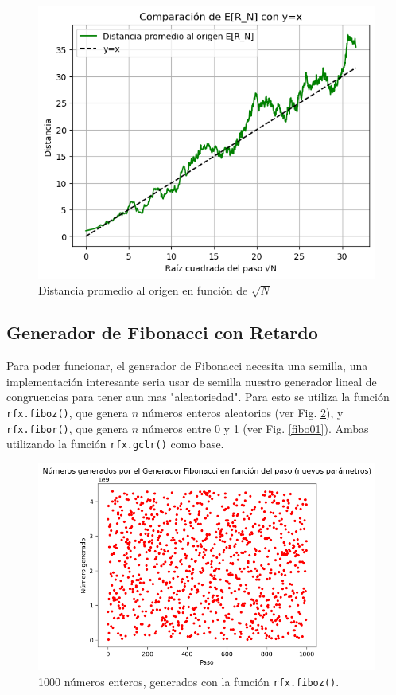 \documentclass[baaa]{baaa}
\begin{document}
\begin{figure}[!h]
    \centering
    \includegraphics[width=0.9\linewidth]{imagenes/rvsqrtn.png}
    \caption{Distancia promedio al origen en función de $\sqrt{N}$}
    \label{rvsqrtn}
\end{figure}

\subsection{Generador de Fibonacci con Retardo}

Para poder funcionar, el generador de Fibonacci necesita una semilla, una implementación interesante seria usar de semilla nuestro generador lineal de congruencias para tener aun mas "aleatoriedad". Para esto se utiliza la función \texttt{rfx.fiboz()}, que genera $n$ números enteros aleatorios (ver Fig. \ref{fibo}), y \texttt{rfx.fibor()}, que genera $n$ números entre 0 y 1 (ver Fig. \ref{fibo01}). Ambas utilizando la función \texttt{rfx.gclr()} como base. 

\begin{figure}[!h]
    \centering
    \includegraphics[width=0.9\linewidth]{imagenes/fibo.png}
    \caption{1000 números enteros, generados con la función \texttt{rfx.fiboz()}.}
    \label{fibo}
\end{figure}
\end{document}

